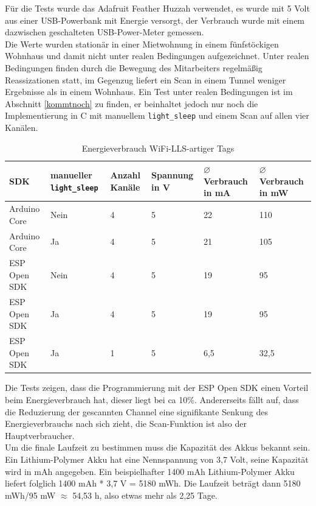 Für die Tests wurde das Adafruit Feather Huzzah verwendet, es wurde mit 5 Volt aus einer USB-Powerbank mit Energie versorgt, der Verbrauch wurde mit einem dazwischen geschalteten USB-Power-Meter gemessen.\\
Die Werte wurden stationär in einer Mietwohnung in einem fünfstöckigen Wohnhaus und damit nicht unter realen Bedingungen aufgezeichnet.
Unter realen Bedingungen finden durch die Bewegung des Mitarbeiters regelmäßig Reassizationen statt, im Gegenzug liefert ein Scan in einem Tunnel weniger Ergebnisse als in einem Wohnhaus.
Ein Test unter realen Bedingungen ist im Abschnitt \ref{kommtnoch} zu finden, er beinhaltet jedoch nur noch die Implementierung in C mit manuellem \texttt{light\_sleep} und einem Scan auf allen vier Kanälen.

\begin{table}[h]
	\centering
	\caption{Energieverbrauch WiFi-LLS-artiger Tags}
	\label{table:llsconsumption}
	\begin{tabular}{p{3cm}|p{2.2cm}|p{1.5cm}|p{2cm}|p{2cm}|p{2cm}}
		SDK & manueller \texttt{light\_sleep} & Anzahl Kanäle & Spannung in V & $\varnothing$ Verbrauch in mA & $\varnothing$ Verbrauch in mW \\
		\hline
		Arduino Core & Nein & 4 & 5 & 22 & 110 \\
		Arduino Core & Ja & 4 & 5 & 21 & 105 \\
		ESP Open SDK & Nein & 4 & 5 & 19 & 95 \\
		ESP Open SDK & Ja & 4 & 5 & 19 & 95 \\
		\hline
		ESP Open SDK & Ja & 1 & 5 & 6,5 & 32,5 \\
	\end{tabular}
\end{table}

Die Tests zeigen, dass die Programmierung mit der ESP Open SDK einen Vorteil beim Energieverbrauch hat, dieser liegt bei ca 10\%.
Andererseits fällt auf, dass die Reduzierung der gescannten Channel eine signifikante Senkung des Energieverbrauchs nach sich zieht, die Scan-Funktion ist also der Hauptverbraucher.\\
Um die finale Laufzeit zu bestimmen muss die Kapazität des Akkus bekannt sein.
Ein Lithium-Polymer Akku hat eine Nennspannung von 3,7 Volt, seine Kapazität wird in mAh angegeben. 
Ein beispielhafter 1400 mAh Lithium-Polymer Akku liefert folglich 1400 mAh * 3,7 V = 5180 mWh.
Die Laufzeit beträgt dann 5180 mWh/95 mW $\approx$ 54,53 h, also etwas mehr als 2,25 Tage.

